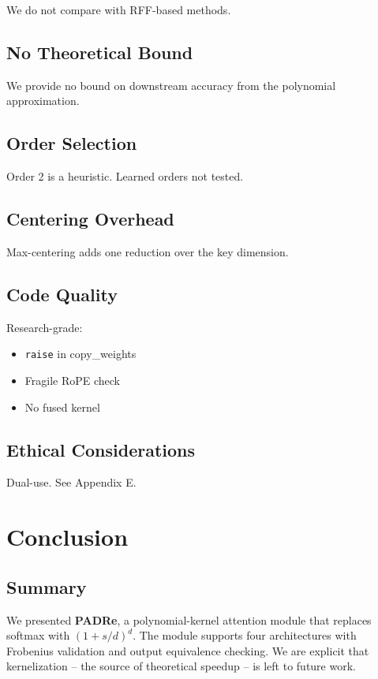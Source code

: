 We do not compare with RFF-based methods.

\subsection{No Theoretical Bound}

We provide no bound on downstream accuracy from the polynomial approximation.

\subsection{Order Selection}

Order 2 is a heuristic. Learned orders not tested.

\subsection{Centering Overhead}

Max-centering adds one reduction over the key dimension.

\subsection{Code Quality}

Research-grade:
\begin{itemize}
\item \texttt{raise} in copy\_weights
\item Fragile RoPE check
\item No fused kernel

\end{itemize}
\subsection{Ethical Considerations}

Dual-use. See Appendix E.



\section{Conclusion}

\subsection{Summary}

We presented \textbf{PADRe}, a polynomial-kernel attention module that replaces 
softmax with $(1 + s/d)^d$. The module supports four architectures with 
Frobenius validation and output equivalence checking. We are explicit that 
kernelization -- the source of theoretical speedup -- is left to future work.

